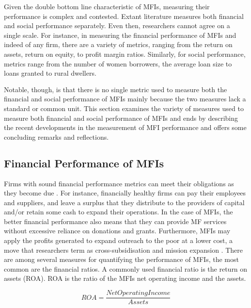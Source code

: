 \documentclass[a4paper, nobind]{templates/ociamthesis}
\begin{document}
\noindent Given the double bottom line characteristic of MFIs, measuring their performance is complex and contested. Extant literature measures both financial and social performance separately. Even then, researchers cannot agree on a single scale. For instance, in measuring the financial performance of MFIs and indeed of any firm, there are a variety of metrics, ranging from the return on assets, return on equity, to profit margin ratios. Similarly, for social performance, metrics range from the number of women borrowers, the average loan size to loans granted to rural dwellers.

Notable, though, is that there is no single metric used to measure both the financial and social performance of MFIs mainly because the two measures lack a standard or common unit. This section examines the variety of measures used to measure both financial and social performance of MFIs and ends by describing the recent developments in the measurement of MFI performance and offers some concluding remarks and reflections.

\hypertarget{financial-performance-of-mfis}{%
\subsection{Financial Performance of MFIs}\label{financial-performance-of-mfis}}

\noindent Firms with sound financial performance metrics can meet their obligations as they become due \autocite{ehrhardt2016corporate}. For instance, financially healthy firms can pay their employees and suppliers, and leave a surplus that they distribute to the providers of capital and/or retain some cash to expand their operations. In the case of MFIs, the better financial performance also means that they can provide MF services without excessive reliance on donations and grants. Furthermore, MFIs may apply the profits generated to expand outreach to the poor at a lower cost, a move that researchers term as cross-subsidisation and mission expansion \autocite{mersland2010microfinance}. There are among several measures for quantifying the performance of MFIs, the most common are the financial ratios.
A commonly used financial ratio is the return on assets (ROA). ROA is the ratio of the MFIs net operating income and the assets.

\begin{equation}
ROA = \frac{Net Operating Income}{Assets}
\end{equation}
\end{document}
